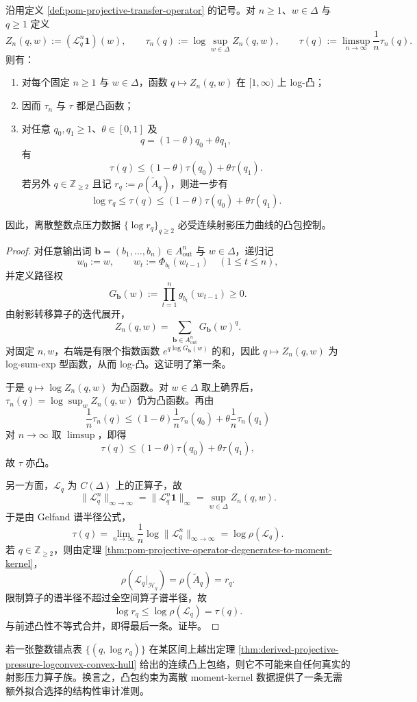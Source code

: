 \begin{theorem}\label{thm:derived-projective-pressure-logconvex-convex-hull}
沿用定义 \ref{def:pom-projective-transfer-operator} 的记号。对 \(n\ge 1\)、\(w\in\Delta\) 与 \(q\ge 1\) 定义
\[
Z_n(q,w):=(\mathcal L_q^n\mathbf 1)(w),
\qquad
\tau_n(q):=\log\sup_{w\in\Delta}Z_n(q,w),
\qquad
\tau(q):=\limsup_{n\to\infty}\frac1n\tau_n(q).
\]
则有：
\begin{enumerate}
  \item 对每个固定 \(n\ge 1\) 与 \(w\in\Delta\)，函数 \(q\mapsto Z_n(q,w)\) 在 \([1,\infty)\) 上 log-凸；
  \item 因而 \(\tau_n\) 与 \(\tau\) 都是凸函数；
  \item 对任意 \(q_0,q_1\ge 1\)、\(\theta\in[0,1]\) 及
  \[
  q=(1-\theta)q_0+\theta q_1,
  \]
  有
  \[
  \tau(q)\le (1-\theta)\tau(q_0)+\theta\tau(q_1).
  \]
  若另外 \(q\in\mathbb Z_{\ge 2}\) 且记 \(r_q:=\rho(\widetilde A_q)\)，则进一步有
  \[
  \boxed{\;
  \log r_q
  \le
  \tau(q)
  \le
  (1-\theta)\tau(q_0)+\theta\tau(q_1).\;}
  \]
\end{enumerate}
因此，离散整数点压力数据 \(\{\log r_q\}_{q\ge 2}\) 必受连续射影压力曲线的凸包控制。
\end{theorem}
\begin{proof}
对任意输出词
\(
\mathbf b=(b_1,\dots,b_n)\in A_{\mathrm{out}}^n
\)
与 \(w\in\Delta\)，递归记
\[
w_0:=w,
\qquad
w_t:=\Phi_{b_t}(w_{t-1})\quad(1\le t\le n),
\]
并定义路径权
\[
G_{\mathbf b}(w):=\prod_{t=1}^{n} g_{b_t}(w_{t-1})\ge 0.
\]
由射影转移算子的迭代展开，
\[
Z_n(q,w)=\sum_{\mathbf b\in A_{\mathrm{out}}^n}G_{\mathbf b}(w)^q.
\]
对固定 \(n,w\)，右端是有限个指数函数 \(e^{q\log G_{\mathbf b}(w)}\) 的和，因此 \(q\mapsto Z_n(q,w)\) 为 log-sum-exp 型函数，从而 log-凸。这证明了第一条。

于是 \(q\mapsto \log Z_n(q,w)\) 为凸函数。对 \(w\in\Delta\) 取上确界后，\(\tau_n(q)=\log\sup_w Z_n(q,w)\) 仍为凸函数。再由
\[
\frac1n\tau_n(q)\le (1-\theta)\frac1n\tau_n(q_0)+\theta\frac1n\tau_n(q_1)
\]
对 \(n\to\infty\) 取 \(\limsup\)，即得
\[
\tau(q)\le (1-\theta)\tau(q_0)+\theta\tau(q_1),
\]
故 \(\tau\) 亦凸。

另一方面，\(\mathcal L_q\) 为 \(C(\Delta)\) 上的正算子，故
\[
\|\mathcal L_q^n\|_{\infty\to\infty}
=
\|\mathcal L_q^n\mathbf 1\|_\infty
=
\sup_{w\in\Delta}Z_n(q,w).
\]
于是由 Gelfand 谱半径公式，
\[
\tau(q)
=
\lim_{n\to\infty}\frac1n\log \|\mathcal L_q^n\|_{\infty\to\infty}
=
\log \rho(\mathcal L_q).
\]
若 \(q\in\mathbb Z_{\ge 2}\)，则由定理 \ref{thm:pom-projective-operator-degenerates-to-moment-kernel}，
\[
\rho(\mathcal L_q|_{\mathcal H_q})=\rho(\widetilde A_q)=r_q.
\]
限制算子的谱半径不超过全空间算子谱半径，故
\[
\log r_q\le \log \rho(\mathcal L_q)=\tau(q).
\]
与前述凸性不等式合并，即得最后一条。证毕。
\end{proof}

\begin{remark}[整数压力表的可实现性判据]\label{rem:derived-projective-pressure-realizability}
若一张整数锚点表 \(\{(q,\log r_q)\}\) 在某区间上越出定理 \ref{thm:derived-projective-pressure-logconvex-convex-hull} 给出的连续凸上包络，则它不可能来自任何真实的射影压力算子族。换言之，凸包约束为离散 moment-kernel 数据提供了一条无需额外拟合选择的结构性审计准则。
\end{remark}
